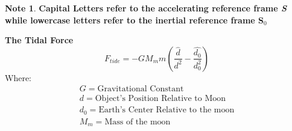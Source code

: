 \documentclass[11pt]{article}
\theoremstyle{definition}
\newtheorem{note}{Note}
\begin{document}
\begin{note}
\textbf{Capital Letters refer to the accelerating reference frame \textit{S} while lowercase letters refer to the inertial reference frame S$_0$}
\end{note}



\begin{shaded}
\textbf{The Tidal Force} \newline
\begin{equation}
F_{tide} = -GM_mm(\frac{\hat{d}}{d^2}-\frac{\hat{d_0}}{d_0^2})
\end{equation}
Where:
\begin{equation*}
\begin{split}
G = \text{Gravitational Constant} \\
d = \text{Object's Position Relative to Moon} \\
d_0 = \text{Earth's Center Relative to the moon}\\
M_m = \text{Mass of the moon}
\end{split}
\end{equation*}
\end{shaded}
\end{document}
